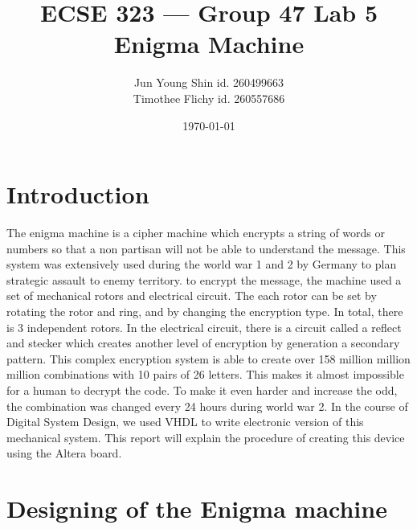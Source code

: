 \documentclass[10pt]{article}
\title{ECSE 323 --- Group 47 Lab 5 Enigma Machine}
\author{Jun Young Shin id. 260499663\\ Timothee Flichy id. 260557686}
\date{\today}
\begin{document}
\maketitle
\section{Introduction}
The enigma machine is a cipher machine which encrypts a string of words or numbers so that a non partisan will not be able to understand the message. This system was extensively used during the world war 1 and 2 by Germany to plan strategic assault to enemy territory. to encrypt the message, the machine used a set of mechanical rotors and electrical circuit. The each rotor can be set by rotating the rotor and ring, and by changing the encryption type. In total, there is 3 independent rotors. In the electrical circuit, there is a circuit called a reflect and stecker which creates another level of encryption by generation a secondary pattern. This complex encryption system is able to create over 158 million million million combinations with 10 pairs of 26 letters. This makes it almost impossible for a human to decrypt the code. To make it even harder and increase the odd, the combination was changed every 24 hours during world war 2. In the course of Digital System Design, we used VHDL to write electronic version of this mechanical system. This report will explain the procedure of creating this device using the Altera board.

\section{Designing of the Enigma machine}

\end{document}
